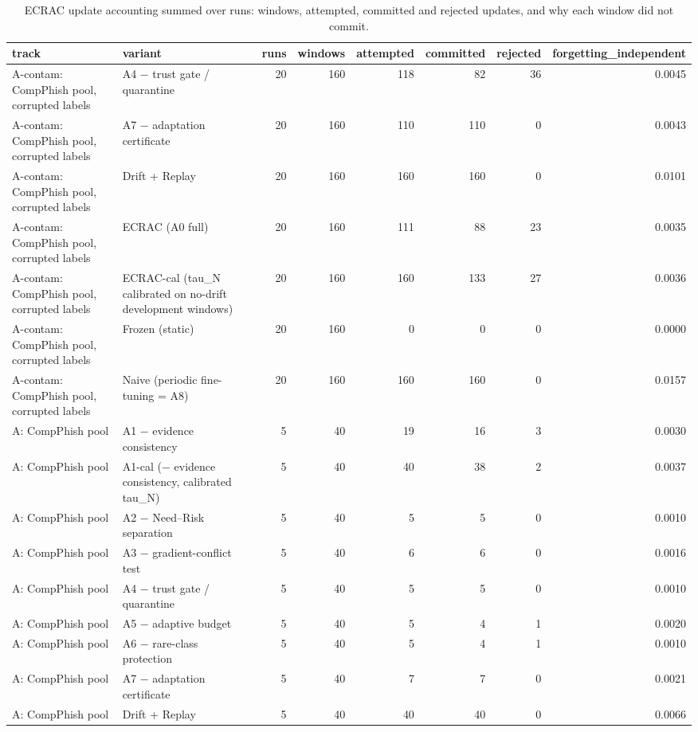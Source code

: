 \begin{table}[t]
\centering
\scriptsize
\caption{ECRAC update accounting summed over runs: windows, attempted, committed and rejected updates, and why each window did not commit.}
\label{tab:rev_R12_ecrac_update_accounting}
\begin{tabular}{llrrrrrr}
\toprule
track & variant & runs & windows & attempted & committed & rejected & forgetting\_independent \\
\midrule
A-contam: CompPhish pool, corrupted labels & A4 − trust gate / quarantine & 20 & 160 & 118 & 82 & 36 & 0.0045 \\
A-contam: CompPhish pool, corrupted labels & A7 − adaptation certificate & 20 & 160 & 110 & 110 & 0 & 0.0043 \\
A-contam: CompPhish pool, corrupted labels & Drift + Replay & 20 & 160 & 160 & 160 & 0 & 0.0101 \\
A-contam: CompPhish pool, corrupted labels & ECRAC (A0 full) & 20 & 160 & 111 & 88 & 23 & 0.0035 \\
A-contam: CompPhish pool, corrupted labels & ECRAC-cal (tau\_N calibrated on no-drift development windows) & 20 & 160 & 160 & 133 & 27 & 0.0036 \\
A-contam: CompPhish pool, corrupted labels & Frozen (static) & 20 & 160 & 0 & 0 & 0 & 0.0000 \\
A-contam: CompPhish pool, corrupted labels & Naive (periodic fine-tuning = A8) & 20 & 160 & 160 & 160 & 0 & 0.0157 \\
A: CompPhish pool & A1 − evidence consistency & 5 & 40 & 19 & 16 & 3 & 0.0030 \\
A: CompPhish pool & A1-cal (− evidence consistency, calibrated tau\_N) & 5 & 40 & 40 & 38 & 2 & 0.0037 \\
A: CompPhish pool & A2 − Need–Risk separation & 5 & 40 & 5 & 5 & 0 & 0.0010 \\
A: CompPhish pool & A3 − gradient-conflict test & 5 & 40 & 6 & 6 & 0 & 0.0016 \\
A: CompPhish pool & A4 − trust gate / quarantine & 5 & 40 & 5 & 5 & 0 & 0.0010 \\
A: CompPhish pool & A5 − adaptive budget & 5 & 40 & 5 & 4 & 1 & 0.0020 \\
A: CompPhish pool & A6 − rare-class protection & 5 & 40 & 5 & 4 & 1 & 0.0010 \\
A: CompPhish pool & A7 − adaptation certificate & 5 & 40 & 7 & 7 & 0 & 0.0021 \\
A: CompPhish pool & Drift + Replay & 5 & 40 & 40 & 40 & 0 & 0.0066 \\

\end{tabular}
\end{table}
